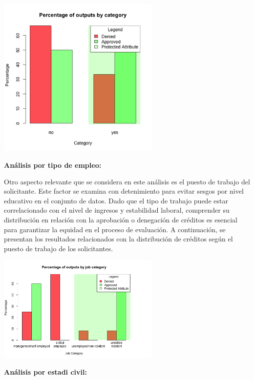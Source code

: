 \documentclass{article}
\begin{document}
\begin{multicols}{2}
\begin{center} %
    \includegraphics[width=8cm]{tex/media/foreign.png} 
\end{center}

\vspace{0.5cm}
\textbf{Análisis por tipo de empleo:}

Otro aspecto relevante que se considera en este análisis es el puesto de trabajo del solicitante. Este factor se examina con detenimiento para evitar sesgos por nivel educativo en el conjunto de datos. Dado que el tipo de trabajo puede estar correlacionado con el nivel de ingresos y estabilidad laboral, comprender su distribución en relación con la aprobación o denegación de créditos es esencial para garantizar la equidad en el proceso de evaluación. A continuación, se presentan los resultados relacionados con la distribución de créditos según el puesto de trabajo de los solicitantes.


\begin{center} %
    \includegraphics[width=8cm]{tex/media/jobs.png} 
\end{center}

\vspace{0.5cm}
\textbf{Análisis por estadi civil:}


\end{multicols}
\end{document}
